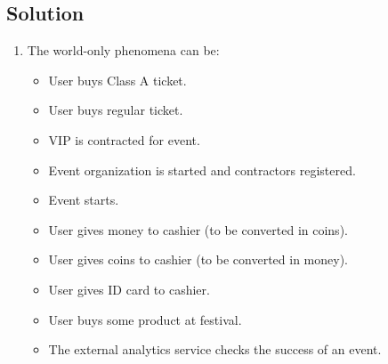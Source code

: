 \documentclass[12pt, a4paper]{report}
\begin{document}
    \subsection*{Solution}
        \begin{enumerate}
            \item The world-only phenomena can be: 
                \begin{itemize}
                    \item User buys Class A ticket.
                    \item User buys regular ticket.
                    \item VIP is contracted for event.
                    \item Event organization is started and contractors registered.
                    \item Event starts.
                    \item User gives money to cashier (to be converted in coins).
                    \item User gives coins to cashier (to be converted in money).
                    \item User gives ID card to cashier.
                    \item User buys some product at festival.
                    \item The external analytics service checks the success of an event.
                \end{itemize}


\end{enumerate}
\end{document}
